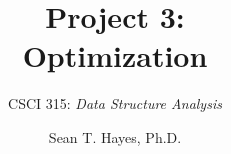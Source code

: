 \documentclass[14pt,aspectratio=1610]{beamer}
\title{\Huge{} Project 3:\\Optimization}
\subtitle{CSCI 315: \textit{Data Structure Analysis}}
\author{Sean T. Hayes, Ph.D.}
\institute{Charleston Southern University}
\begin{document}
\begin{frame}
  \titlepage{}
\end{frame}
\end{document}
